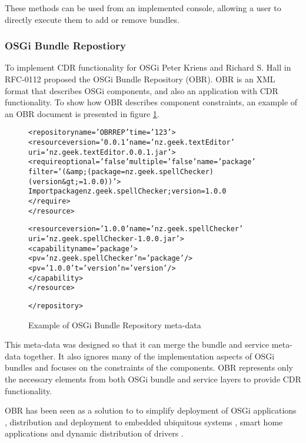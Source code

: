 These methods can be used from an implemented console, allowing a user to directly execute them to add or remove bundles.

\subsubsection{OSGi Bundle Repostiory}
To implement CDR functionality for OSGi Peter Kriens and Richard S. Hall in RFC-0112 \citep{the_osgi_alliance_rfc-0112_2006} proposed the OSGi Bundle Repository (OBR).
OBR is an XML format that describes OSGi components, and also an application with CDR functionality.
To show how OBR describes component constraints, an example of an OBR document is presented in figure \ref{obrmetadata}.

\begin{figure}[htp]
\begin{center}
\begin{alltt}
<repository name='OBR REP' time='123'> 
 <resource version='0.0.1' name='nz.geek.textEditor' 
 uri='nz.geek.textEditor.0.0.1.jar'> 
  <require optional='false'  multiple='false'  name='package' 
    filter='(&amp;(package=nz.geek.spellChecker)(version&gt;=1.0.0))'> 
   Import package nz.geek.spellChecker ;version=1.0.0 
  </require> 
 </resource> 

 <resource version='1.0.0' name='nz.geek.spellChecker' 
 uri='nz.geek.spellChecker-1.0.0.jar'> 
  <capability name='package'> 
    <p v='nz.geek.spellChecker' n='package'/> 
    <p v='1.0.0' t='version' n='version'/> 
  </capability> 
 </resource> 

</repository>
\end{alltt}
  \caption{Example of OSGi Bundle Repository meta-data}
  \label{obrmetadata}
\end{center}
\end{figure}

This meta-data was designed so that it can merge the bundle and service meta-data together.
It also ignores many of the implementation aspects of OSGi bundles and focuses on the constraints of the components.
OBR represents only the necessary elements from both OSGi bundle and service layers to provide CDR functionality. 

OBR has been seen as a solution to to simplify deployment of OSGi applications \citep{Jung2007}, 
distribution and deployment to embedded ubiquitous systems \citep{Jung2006}, 
smart home applications \citep{Gouin-Vallerand2007} and 
dynamic distribution of drivers \citep{Kriens2008}. 

